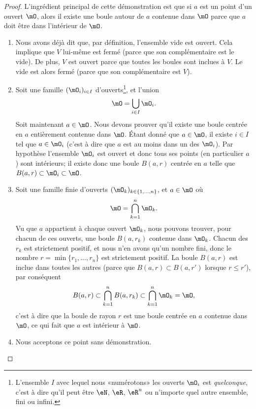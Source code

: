 \begin{proof}
	L'ingrédient principal de cette démonstration est que si $a$ est un point d'un ouvert $\mO$, alors il existe une boule autour de $a$ contenue dans $\mO$ parce que $a$ doit être dans l'intérieur de $\mO$.
	\begin{enumerate}

		\item
			Nous avons déjà dit que, par définition, l'ensemble vide est ouvert. Cela implique que $V$ lui-même est fermé (parce que son complémentaire est le vide). De plus, $V$ est ouvert parce que toutes les boules sont inclues à $V$. Le vide est alors fermé (parce que son complémentaire est $V$).
		\item
			Soit une famille $(\mO_i)_{i\in I}$ d'ouverts\footnote{L'ensemble $I$ avec lequel nous «numérotons» les ouverts $\mO_i$ est \emph{quelconque}, c'est à dire qu'il peut être $\eN$, $\eR$, $\eR^n$ ou n'importe quel autre ensemble, fini ou infini.}, et l'union
			\begin{equation}
				\mO=\bigcup_{i\in I}\mO_i.
			\end{equation}
			Soit maintenant $a\in\mO$. Nous devons prouver qu'il existe une boule centrée en $a$ entièrement contenue dans $\mO$. Étant donné que $a\in\mO$, il existe $i\in I$ tel que $a\in\mO_i$ (c'est à dire que $a$ est au moins dans un des $\mO_i$). Par hypothèse l'ensemble $\mO_i$ est ouvert et donc tous ses points (en particulier $a$) sont intérieurs; il existe donc une boule $B(a,r)$ centrée en $a$ telle que $B(a,r)\subset\mO_i\subset\mO$.

		\item
			Soit une famille finie d'ouverts $(\mO_k)_{k\in\{ 1,\ldots,n \}}$, et $a\in\mO$ où
			\begin{equation}
				\mO=\bigcap_{k=1}^n\mO_k.
			\end{equation}
			Vu que $a$ appartient à chaque ouvert $\mO_k$, nous pouvons trouver, pour chacun de ces ouverts, une boule $B(a,r_k)$ contenue dans $\mO_k$. Chacun des $r_k$ est strictement positif, et nous n'en avons qu'un nombre fini, donc le nombre $r=\min\{ r_1,\ldots,r_n \}$ est strictement positif. La boule $B(a,r)$ est inclue dans toutes les autres (parce que $B(a,r)\subset B(a,r')$ lorsque $r\leq r'$), par conséquent
			\begin{equation}
				B(a,r)\subset\bigcap_{k=1}^nB(a,r_k)\subset\bigcap_{k=1}^n\mO_k=\mO,
			\end{equation}
			c'est à dire que la boule de rayon $r$ est une boule centrée en $a$ contenue dans $\mO$, ce qui fait que $a$ est intérieur à $\mO$.
		\item
			Nous acceptons ce point sans démonstration.
	\end{enumerate}

\end{proof}

